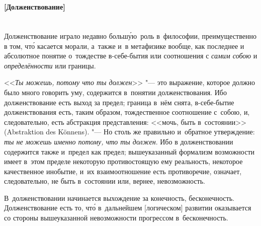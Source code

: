\paragraph[Примечание. Долженствование]%
{\nopagebreak\\\vspace{1mm}
\footnotesize [Долженствование]\\\vspace{2mm}\\}

Долженствование играло недавно больш\'{у}ю~роль в~философии, преимущественно в
том, чт\'{о} касается морали, а~также и~в метафизике вообще, как последнее и
абсолютное понятие о~тождестве в-себе-бытия или соотношения с
{\em самим собою} и {\em определённости} или границы.

<<{\em Ты можешь, потому что ты должен}>> "--- это выражение,
которое должно было много говорить уму, содержится в~понятии долженствования.
Ибо долженствование есть выход за предел; граница в~нём снята, в-себе-бытие
долженствования есть, таким образом, тождественное соотношение с~собою, и,
следовательно, есть абстракция представления: <<мочь, быть в~состоянии>>
(Abstraktion des Könnens). "--- Но столь же правильно и~обратное утверждение:
{\em ты не можешь именно потому, что ты должен}. Ибо в
долженствовании содержится также и~предел как предел; вышеуказанный
формализм возможности имеет в~этом пределе некоторую противостоящую ему
реальность, некоторое качественное инобытие, и~их взаимоотношение есть
противоречие, означает, следовательно, не быть в~состоянии или, вернее,
невозможность.

В~долженствовании начинается выхождение за конечность, бесконечность.
Долженствование есть то, чт\'{о} в~дальнейшем [логическом] развитии оказывается
со стороны вышеуказанной невозможности прогрессом в~бесконечность.

